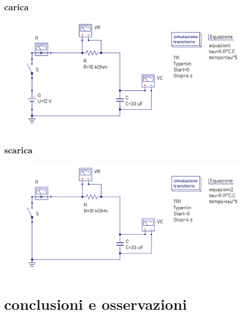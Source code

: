 \documentclass{article}
\begin{document}
\subsubsection*{carica}

\begin{figure}[!h]
  \includegraphics[width=\linewidth]{data/carica-simulazione-qucs.png}
\end{figure}

\subsubsection*{scarica}

\begin{figure}[!h]
  \includegraphics[width=\linewidth]{data/scarica-simulazione-qucs.png}
\end{figure}

\newpage

\section*{conclusioni e osservazioni}
\blindtext[1]
\end{document}
